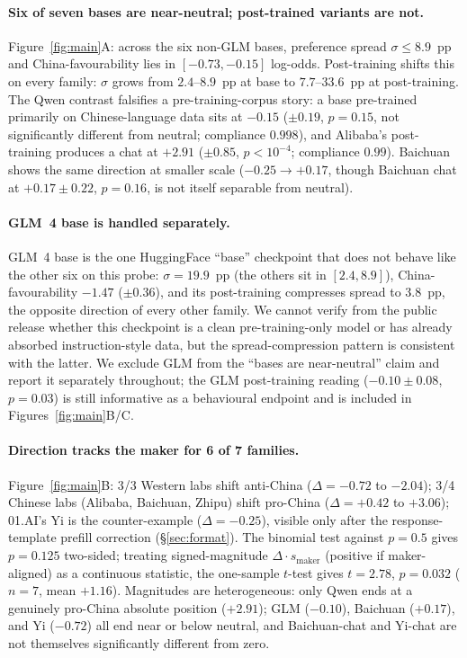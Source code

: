 \documentclass[letterpaper]{article} %
\begin{document}
\paragraph{Six of seven bases are near-neutral; post-trained variants are not.} Figure~\ref{fig:main}A: across the six non-GLM bases, preference spread $\sigma \leq 8.9$~pp and China-favourability lies in $[-0.73, -0.15]$ log-odds. Post-training shifts this on every family: $\sigma$ grows from $2.4$--$8.9$~pp at base to $7.7$--$33.6$~pp at post-training. The Qwen contrast falsifies a pre-training-corpus story: a base pre-trained primarily on Chinese-language data sits at $-0.15$ ($\pm 0.19$, $p = 0.15$, not significantly different from neutral; compliance $0.998$), and Alibaba's post-training produces a chat at $+2.91$ ($\pm 0.85$, $p < 10^{-4}$; compliance $0.99$). Baichuan shows the same direction at smaller scale ($-0.25 \to +0.17$, though Baichuan chat at $+0.17 \pm 0.22$, $p = 0.16$, is not itself separable from neutral).

\paragraph{GLM~4 base is handled separately.} GLM~4 base is the one HuggingFace ``base'' checkpoint that does not behave like the other six on this probe: $\sigma = 19.9$~pp (the others sit in $[2.4, 8.9]$), China-favourability $-1.47$ ($\pm 0.36$), and its post-training compresses spread to $3.8$~pp, the opposite direction of every other family. We cannot verify from the public release whether this checkpoint is a clean pre-training-only model or has already absorbed instruction-style data, but the spread-compression pattern is consistent with the latter. We exclude GLM from the ``bases are near-neutral'' claim and report it separately throughout; the GLM post-training reading ($-0.10 \pm 0.08$, $p = 0.03$) is still informative as a behavioural endpoint and is included in Figures~\ref{fig:main}B/C.

\paragraph{Direction tracks the maker for 6 of 7 families.} Figure~\ref{fig:main}B: 3/3 Western labs shift anti-China ($\Delta = -0.72$ to $-2.04$); 3/4 Chinese labs (Alibaba, Baichuan, Zhipu) shift pro-China ($\Delta = +0.42$ to $+3.06$); 01.AI's Yi is the counter-example ($\Delta = -0.25$), visible only after the response-template prefill correction (\S\ref{sec:format}). The binomial test against $p = 0.5$ gives $p = 0.125$ two-sided; treating signed-magnitude $\Delta \cdot s_{\text{maker}}$ (positive if maker-aligned) as a continuous statistic, the one-sample $t$-test gives $t = 2.78$, $p = 0.032$ ($n = 7$, mean $+1.16$). Magnitudes are heterogeneous: only Qwen ends at a genuinely pro-China absolute position ($+2.91$); GLM ($-0.10$), Baichuan ($+0.17$), and Yi ($-0.72$) all end near or below neutral, and Baichuan-chat and Yi-chat are not themselves significantly different from zero.
\end{document}
